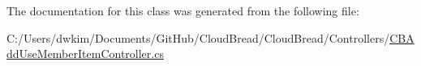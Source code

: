 The documentation for this class was generated from the following file\+:\begin{DoxyCompactItemize}
\item 
C\+:/\+Users/dwkim/\+Documents/\+Git\+Hub/\+Cloud\+Bread/\+Cloud\+Bread/\+Controllers/\hyperlink{_c_b_add_use_member_item_controller_8cs}{C\+B\+Add\+Use\+Member\+Item\+Controller.\+cs}\end{DoxyCompactItemize}
